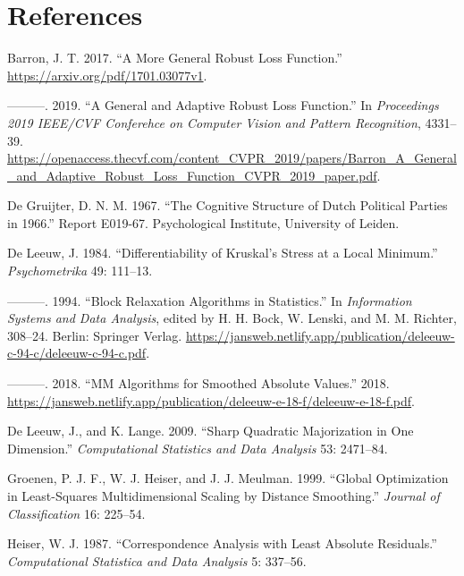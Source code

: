 \documentclass[
  12pt,
  letterpaper,
  DIV=11,
  numbers=noendperiod]{scrartcl}
\newlength{\cslhangindent}
\newenvironment{CSLReferences}[2] %
 {\begin{list}{}{%
  \setlength{\itemindent}{0pt}
  \setlength{\leftmargin}{0pt}
  \setlength{\parsep}{0pt}
  \ifodd #1
   \setlength{\leftmargin}{\cslhangindent}
   \setlength{\itemindent}{-1\cslhangindent}
  \fi
  \setlength{\itemsep}{#2\baselineskip}}}
 {\end{list}}
\begin{document}
\section*{References}\label{references}

\label{refs}
\begin{CSLReferences}{1}{0}
Barron, J. T. 2017. {``A More General Robust Loss Function.''}
\url{https://arxiv.org/pdf/1701.03077v1}.

---------. 2019. {``A General and Adaptive Robust Loss Function.''} In
\emph{Proceedings 2019 IEEE/CVF Conferehce on Computer Vision and
Pattern Recognition}, 4331--39.
\url{https://openaccess.thecvf.com/content_CVPR_2019/papers/Barron_A_General_and_Adaptive_Robust_Loss_Function_CVPR_2019_paper.pdf}.

De Gruijter, D. N. M. 1967. {``{The Cognitive Structure of Dutch
Political Parties in 1966}.''} Report E019-67. Psychological Institute,
University of Leiden.

De Leeuw, J. 1984. {``{Differentiability of Kruskal's Stress at a Local
Minimum}.''} \emph{Psychometrika} 49: 111--13.

---------. 1994. {``{Block Relaxation Algorithms in Statistics}.''} In
\emph{Information Systems and Data Analysis}, edited by H. H. Bock, W.
Lenski, and M. M. Richter, 308--24. Berlin: Springer Verlag.
\url{https://jansweb.netlify.app/publication/deleeuw-c-94-c/deleeuw-c-94-c.pdf}.

---------. 2018. {``{MM Algorithms for Smoothed Absolute Values}.''}
2018.
\url{https://jansweb.netlify.app/publication/deleeuw-e-18-f/deleeuw-e-18-f.pdf}.

De Leeuw, J., and K. Lange. 2009. {``Sharp Quadratic Majorization in One
Dimension.''} \emph{Computational Statistics and Data Analysis} 53:
2471--84.

Groenen, P. J. F., W. J. Heiser, and J. J. Meulman. 1999. {``{Global
Optimization in Least-Squares Multidimensional Scaling by Distance
Smoothing}.''} \emph{Journal of Classification} 16: 225--54.

Heiser, W. J. 1987. {``{Correspondence Analysis with Least Absolute
Residuals}.''} \emph{Computational Statistica and Data Analysis} 5:
337--56.


\end{CSLReferences}
\end{document}
